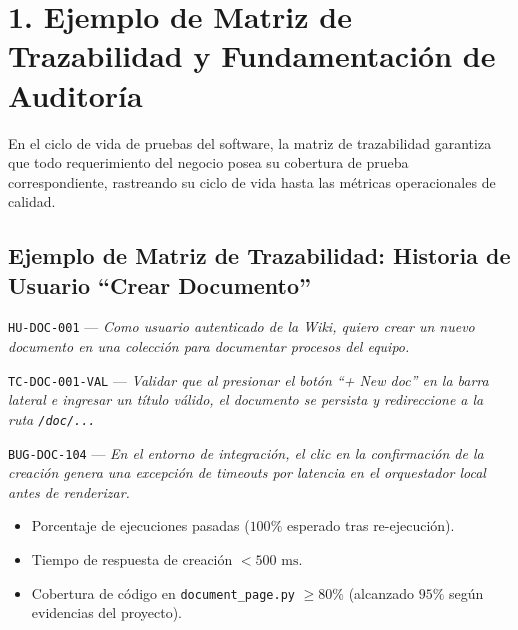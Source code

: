 \documentclass[12pt,a4paper]{article}
\begin{document}


\vspace{0.3cm}

\section*{\color{primary} 1. Ejemplo de Matriz de Trazabilidad y Fundamentación de Auditoría}

En el ciclo de vida de pruebas del software, la matriz de trazabilidad garantiza que todo requerimiento del negocio posea su cobertura de prueba correspondiente, rastreando su ciclo de vida hasta las métricas operacionales de calidad.

\subsection*{\color{secondary} Ejemplo de Matriz de Trazabilidad: Historia de Usuario ``Crear Documento''}

\begin{description}[font=\bfseries\color{primary}]
    \item[Requisito (Historia de Usuario):] \texttt{HU-DOC-001} --- \textit{Como usuario autenticado de la Wiki, quiero crear un nuevo documento en una colección para documentar procesos del equipo.}
    \item[Caso de Prueba (Test Case):] \texttt{TC-DOC-001-VAL} --- \textit{Validar que al presionar el botón ``+ New doc'' en la barra lateral e ingresar un título válido, el documento se persista y redireccione a la ruta \texttt{/doc/...}}
    \item[Defecto (Bug Report):] \texttt{BUG-DOC-104} --- \textit{En el entorno de integración, el clic en la confirmación de la creación genera una excepción de timeouts por latencia en el orquestador local antes de renderizar.}
    \item[Métricas de Calidad:]
    \begin{itemize}[leftmargin=*, noitemsep]
        \item Porcentaje de ejecuciones pasadas ($100\%$ esperado tras re-ejecución).
        \item Tiempo de respuesta de creación $< 500\text{ ms}$.
        \item Cobertura de código en \texttt{document\_page.py} $\ge 80\%$ (alcanzado $95\%$ según evidencias del proyecto).
    \end{itemize}
\end{description}
\end{document}
